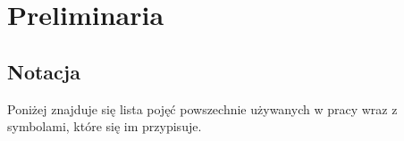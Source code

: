 \documentclass[12pt,a4paper]{report}
\begin{document}

\chapter{Preliminaria}  

\section{Notacja} 

Poniżej znajduje się lista pojęć powszechnie używanych w pracy wraz z symbolami, które się im  przypisuje. 
  
\end{document}
